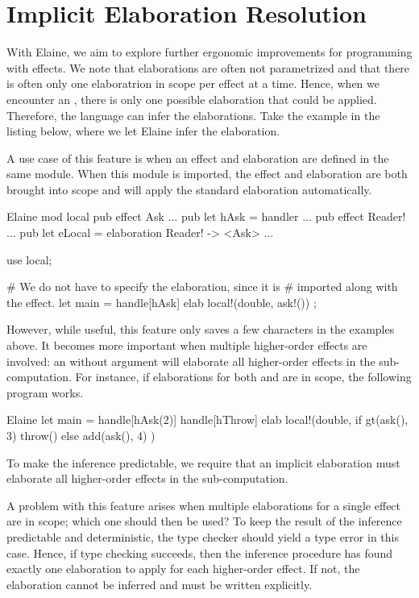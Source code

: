 \chapter{Implicit Elaboration Resolution}\label{chap:elabres}

With Elaine, we aim to explore further ergonomic improvements for programming with effects. We note that elaborations are often not parametrized and that there is often only one elaboratrion in scope per effect at a time. Hence, when we encounter an , there is only one possible elaboration that could be applied. Therefore, the language can infer the elaborations. Take the example in the listing below, where we let Elaine infer the elaboration.

%
A use case of this feature is when an effect and elaboration are defined in the same module. When this module is imported, the effect and elaboration are both brought into scope and  will apply the standard elaboration automatically.

\begin{lst}{Elaine}
mod local {
    pub effect Ask { ... }
    pub let hAsk = handler { ... }
    pub effect Reader! { ... }
    pub let eLocal = elaboration Reader! -> <Ask> { ... }
}

use local;

# We do not have to specify the elaboration, since it is
# imported along with the effect.
let main = handle[hAsk] elab { local!(double, ask!()) };
\end{lst}
%
However, while useful, this feature only saves a few characters in the examples above. It becomes more important when multiple higher-order effects are involved: an  without argument will elaborate all higher-order effects in the sub-computation. For instance, if elaborations for both  and  are in scope, the following program works.

\begin{lst}{Elaine}
let main = handle[hAsk(2)] handle[hThrow] elab {
    local!(double, {
        if gt(ask(), 3) {
            throw() 
        } else {
            add(ask(), 4)
        }
    })
}
\end{lst}
%
To make the inference predictable, we require that an implicit elaboration must elaborate all higher-order effects in the sub-computation.

A problem with this feature arises when multiple elaborations for a single effect are in scope; which one should then be used? To keep the result of the inference predictable and deterministic, the type checker should yield a type error in this case. Hence, if type checking succeeds, then the inference procedure has found exactly one elaboration to apply for each higher-order effect. If not, the elaboration cannot be inferred and must be written explicitly.

